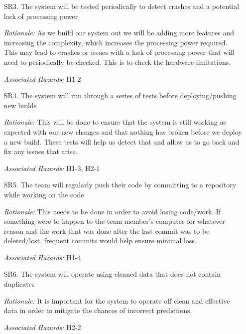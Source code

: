 \documentclass{article}
\begin{document}
\begin{enumerate}
   \item[SR3.] The system will be tested periodically to detect crashes and a potential lack of processing power
   \item[] \emph{Rationale:} As we build our system out we will be adding more features and increasing the complexity, which increases the processing power required. This may lead to crashes or issues with a lack of processing power that will need to periodically be checked. This is to check the hardware limitations.
   \item[] \emph{Associated Hazards:} H1-2\\
   \item[SR4.] The system will run through a series of tests before deploying/pushing new builds
   \item[] \emph{Rationale:} This will be done to ensure that the system is still working as expected with our new changes and that nothing has broken before we deploy a new build. These tests will help us detect that and allow us to go back and fix any issues that arise.
   \item[] \emph{Associated Hazards:} H1-3, H2-1  \\
   \item[SR5.] The team will regularly push their code by committing to a repository while working on the code
   \item[] \emph{Rationale:} This needs to be done in order to avoid losing code/work. If something were to happen to the team member's computer for whatever reason and the work that was done after the last commit was to be deleted/lost, frequent commits would help ensure minimal loss.
   \item[] \emph{Associated Hazards:} H1-4 \\
 
   \item[SR6.] The system will operate using cleaned data that does not contain duplicates
   \item[] \emph{Rationale:} It is important for the system to operate off clean and effective data in order to mitigate the chances of incorrect predictions.
   \item[] \emph{Associated Hazards:} H2-2 \\
 

\end{enumerate}
\end{document}
